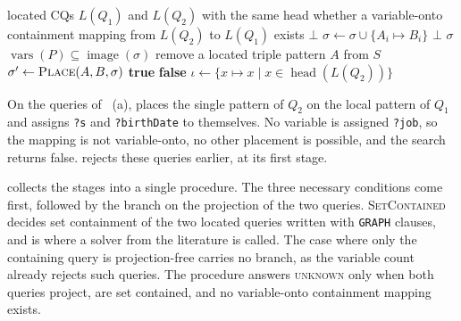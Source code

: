 \begin{algorithm}
  \caption{Search for a variable-onto containment mapping}
  \label{alg_variable_onto}
  \begin{algorithmic}[1]
    \Require located \acp{CQ} $L(Q_1)$ and $L(Q_2)$ with the same head
    \Ensure whether a variable-onto containment mapping from $L(Q_2)$ to $L(Q_1)$ exists
            \State \Return $\bot$
          \EndIf
          \State $\sigma \gets \sigma \cup \{A_i \mapsto B_i\}$
          \State \Return $\bot$
        \EndIf
      \EndFor
      \State \Return $\sigma$
    \EndFunction
        \State \Return $\operatorname{vars}(P) \subseteq \operatorname{image}(\sigma)$
      \EndIf
      \State remove a located triple pattern $A$ from $S$
        \State $\sigma' \gets \Call{Place}{A, B, \sigma}$
          \State \Return \textbf{true}
        \EndIf
      \EndFor
      \State \Return \textbf{false}
    \EndFunction
      \State $\iota \gets \{x \mapsto x \mid x \in \operatorname{head}(L(Q_2))\}$
      \State \Return {}
    \EndFunction
  \end{algorithmic}
\end{algorithm}

On the queries of ~(a),  places the single pattern of $Q_2$ on the local pattern of $Q_1$ and assigns \texttt{?s} and \texttt{?birthDate} to themselves.
No variable is assigned \texttt{?job}, so the mapping is not variable-onto, no other placement is possible, and the search returns false.
 rejects these queries earlier, at its first stage.

 collects the stages into a single procedure.
The three necessary conditions come first, followed by the branch on the projection of the two queries.
\textsc{SetContained} decides set containment of the two located queries written with \texttt{GRAPH} clauses, and is where a solver from the literature is called.
The case where only the containing query is projection-free carries no branch, as the variable count already rejects such queries.
The procedure answers \textsc{unknown} only when both queries project, are set contained, and no variable-onto containment mapping exists.

